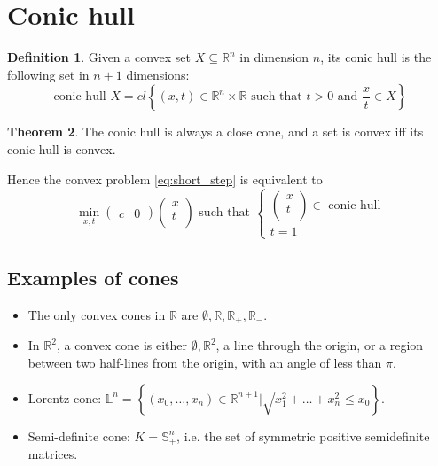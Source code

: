 \documentclass[12pt, openany]{report}
\newcommand{\R}{\mathbb{R}}
\theoremstyle{definition}
\newtheorem{thm}{Theorem}[chapter]
\newtheorem{definition}[thm]{Definition}
\begin{document}
\section{Conic hull}
\begin{definition}
    Given a convex set $X\subseteq \R^n$ in dimension $n$, its conic hull is the following set in $n+1$ dimensions:
    \begin{equation}
        \text{conic hull }X = cl\left\{(x,t)\in \R^n\times \R \text{ such that } t>0 \text{ and }\frac{x}{t}\in X\right\}
    \end{equation}
\end{definition}
\begin{thm}
    The conic hull is always a close cone, and a set is convex iff its conic hull is convex.
\end{thm}
Hence the convex problem \eqref{eq:short_step} is equivalent to 
\begin{equation}
    \min_{x,t} \begin{pmatrix}
        c & 0
    \end{pmatrix}\begin{pmatrix}
        x\\t \\
    \end{pmatrix} \text{ such that }
    \begin{cases}
        \begin{pmatrix} x \\t\\ \end{pmatrix}
        \in \text{ conic hull}\\
        t = 1    
    \end{cases}
\end{equation}
\subsection{Examples of cones}
\begin{itemize}
    \item The only convex cones in $\R$ are $\emptyset, \R,\R_+,\R_-$. 
    \item In $\R^2$, a convex cone is either $\emptyset, \R^2$, a line through the origin, or a region between two half-lines from the origin, with an angle of less than $\pi$. 
    \item Lorentz-cone: $\mathbb{L}^n = \left\{(x_0,\dots,x_n)\in \R^{n+1}|\sqrt{x_1^2+\dots+x_n^2}\le x_0\right\}$. 
    \item Semi-definite cone: $K=\mathbb{S}_+^n$, i.e. the set of symmetric positive semidefinite matrices. 
\end{itemize}
\end{document}
